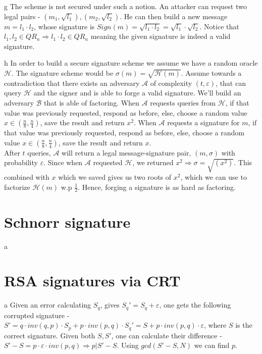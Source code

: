\documentclass{article}
\begin{document}
\begin{paragraph}
    g The scheme is not secured under such a notion. An attacker can request two legal pairs - 
    $(m_1, \sqrt{l_1}), (m_2, \sqrt{l_2})$. He can then build a new message $m = l_1 \cdot l_2$,
    whose signature is $Sign(m) = \sqrt{l_1 \cdot l_2} = \sqrt{l_1}\cdot \sqrt{l_2}$.
    Notice that $l_1, l_2 \in QR_n \Rightarrow l_1 \cdot l_2 \in QR_n$ meaning the given signature
    is indeed a valid signature.
\end{paragraph}

\begin{paragraph}
    h In order to build a secure signature scheme we assume we have a random oracle $\mathcal{H}$.
    The signature scheme would be $\sigma(m) = \sqrt{\mathcal{H}(m)}$.
    Assume towards a contradiction that there exists an adversary $\mathcal{A}$ of complexity $(t, \varepsilon)$,
    that can query $\mathcal{H}$ and the signer and is able to forge a valid signature. We'll build an adversary
    $\mathcal{B}$ that is able of factoring. When $\mathcal{A}$ requests queries from $\mathcal{H}$, if that value was
    previously requested, respond as before, else, choose a random value $x \in (\frac{n}{8}, \frac{n}{4})$,
    save the result and return $x^2$. When $\mathcal{A}$ requests a signature for $m$, if that value was
    previously requested, respond as before, else, choose a random value $x \in (\frac{n}{8}, \frac{n}{4})$,
    save the result and return $x$. \\
    After $t$ queries, $\mathcal{A}$ will return a legal message-signature pair, $(m, \sigma)$ with probability $\varepsilon$.
    Since when $\mathcal{A}$ requested $\mathcal{H}$, we returned $x^2 \Rightarrow \sigma = \sqrt{(x^2)}$. This
    combined with $x$ which we saved gives us two roots of $x^2$, which we can use to factorize
    $\mathcal{H}(m)$ w.p $\frac{1}{2}$. Hence, forging a signature is as hard as factoring.
\end{paragraph}

\section{Schnorr signature}
\quad a 

\section{RSA signatures via CRT}
\begin{paragraph}
    a Given an error calculating $S_q$, gives $S_q' = S_q + \varepsilon$, one gets the following
    corrupted signature - $S' = q\cdot inv(q, p)\cdot S_p + p\cdot inv(p,q)\cdot S_q' =
    S + p\cdot inv(p,q)\cdot \varepsilon$, where $S$ is the correct signature. Given both $S, S'$,
    one can calculate their difference - $S' - S = p\cdot \varepsilon\cdot inv(p,q) \Rightarrow p|S'-S$.
    Using $gcd(S' - S, N)$ we can find $p$.
\end{paragraph}
\end{document}
